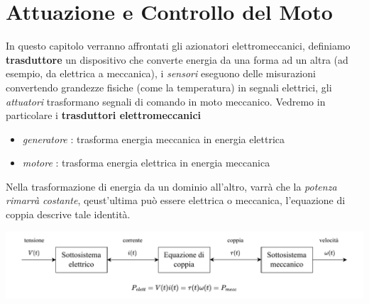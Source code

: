 \documentclass[10pt, letterpaper]{report}
\begin{document}
\chapter{Attuazione e Controllo del Moto}
In questo capitolo verranno affrontati gli azionatori elettromeccanici, definiamo \textbf{trasduttore} un dispositivo che converte energia da una forma ad un altra (ad esempio, da elettrica a meccanica), i \textit{sensori} eseguono delle misurazioni convertendo grandezze fisiche (come la temperatura) in segnali elettrici, gli \textit{attuatori} trasformano segnali di comando in moto meccanico.\acc 
Vedremo in particolare i \textbf{trasduttori elettromeccanici}\begin{itemize}
    \item \textit{generatore} : trasforma energia meccanica in energia elettrica 
    \item \textit{motore} : trasforma energia elettrica in energia meccanica
\end{itemize}
Nella trasformazione di energia da un dominio all'altro, varrà che la \textit{potenza rimarrà costante}, qeust'ultima può essere elettrica o meccanica, l'equazione di coppia descrive tale 
identità.\begin{center}
    \includegraphics[width=1\textwidth ]{images/eqCoppia.pdf}
\end{center}
\end{document}
